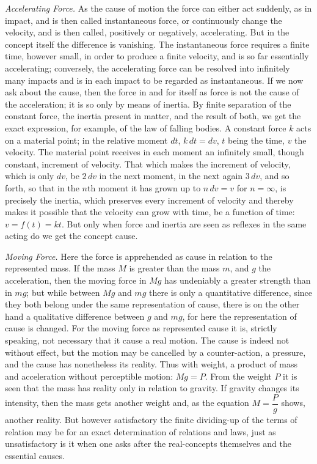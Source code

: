 \documentclass[12pt]{book}
\begin{document}
\emph{Accelerating Force.} As the cause of motion the force can either act
suddenly, as in impact, and is then called instantaneous force, or continuously
change the velocity, and is then called, positively or negatively, accelerating.
But in the concept itself the difference is vanishing. The instantaneous force
requires a finite time, however small, in order to produce a finite velocity, and
is so far essentially accelerating; conversely, the accelerating force can be
resolved into infinitely many impacts and is in each impact to be regarded as
instantaneous. If we now ask about the cause, then the force in and for itself as
force is not the cause of the acceleration; it is so only by means of inertia. By
finite separation of the constant force, the inertia present in matter, and the
result of both, we get the exact expression, for example, of the law of falling
bodies. A constant force $k$ acts on a material point; in the relative moment $dt$,
$k\,dt = dv$, $t$ being the time, $v$ the velocity. The material point receives in
each moment an infinitely small, though constant, increment of velocity. That which
makes the increment of velocity, which is only $dv$, be $2\,dv$ in the next moment,
in the next again $3\,dv$, and so forth, so that in the $n$th moment it has grown
up to $n\,dv = v$ for $n = \infty$, is precisely the inertia, which preserves every
increment of velocity and thereby makes it possible that the velocity can grow with
time, be a function of time: $v = f(t) = kt$. But only when force and inertia are
seen as reflexes in the same acting do we get the concept cause.

\emph{Moving Force.} Here the force is apprehended as cause in relation to the
represented mass. If the mass $M$ is greater than the mass $m$, and $g$ the
acceleration, then the moving force in $Mg$ has undeniably a greater strength than
in $mg$; but while between $Mg$ and $mg$ there is only a quantitative difference,
since they both belong under the same representation of cause, there is on the other
hand a qualitative difference between $g$ and $mg$, for here the representation of
cause is changed. For the moving force as represented cause it is, strictly
speaking, not necessary that it cause a real motion. The cause is indeed not without
effect, but the motion may be cancelled by a counter-action, a pressure, and the
cause has nonetheless its reality. Thus with weight, a product of mass and
acceleration without perceptible motion: $Mg = P$. From the weight $P$ it is seen
that the mass has reality only in relation to gravity. If gravity changes its
intensity, then the mass gets another weight and, as the equation $M =
\dfrac{P}{g}$ shows, another reality. But however satisfactory the finite
dividing-up of the terms of relation may be for an exact determination of relations
and laws, just as unsatisfactory is it when one asks after the real-concepts
themselves and the essential causes.
\end{document}
